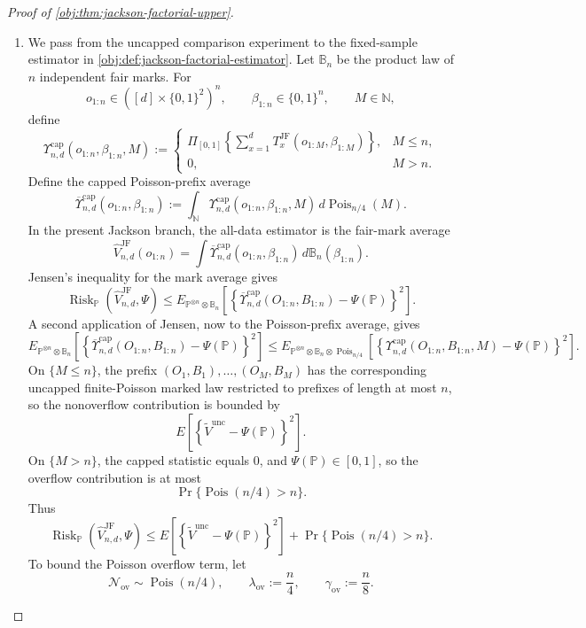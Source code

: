 \documentclass[11pt]{article}
\begin{document}
\begin{proof}[Proof of \cref{obj:thm:jackson-factorial-upper}]
\begin{enumerate}
\item We pass from the uncapped comparison experiment to the fixed-sample
estimator in \cref{obj:def:jackson-factorial-estimator}.  Let
\(\mathbb B_n\) be the product law of \(n\) independent fair marks.  For
\[
o_{1:n}\in([d]\times\{0,1\}^2)^n,
\qquad
\beta_{1:n}\in\{0,1\}^n,
\qquad
M\in\mathbb N,
\]
define
\[
\Upsilon_{n,d}^{\mathrm{cap}}(o_{1:n},\beta_{1:n},M)
:=
\begin{cases}
\Pi_{[0,1]}\!\left\{
\sum_{x=1}^d
T_x^{\mathrm{JF}}(o_{1:M},\beta_{1:M})
\right\},
& M\le n,\\[0.4em]
0, & M>n .
\end{cases}
\]
Define the capped Poisson-prefix average
\[
\overline\Upsilon_{n,d}^{\mathrm{cap}}(o_{1:n},\beta_{1:n})
:=
\int_{\mathbb N}
\Upsilon_{n,d}^{\mathrm{cap}}(o_{1:n},\beta_{1:n},M)\,
d\operatorname{Pois}_{n/4}(M).
\]
In the present Jackson branch, the all-data estimator is the fair-mark average
\[
\widehat V_{n,d}^{\mathrm{JF}}(o_{1:n})
=
\int
\overline\Upsilon_{n,d}^{\mathrm{cap}}(o_{1:n},\beta_{1:n})\,
d\mathbb B_n(\beta_{1:n}).
\]
Jensen's inequality for the mark average gives
\[
\operatorname{Risk}_{\mathbb P}
(\widehat V_{n,d}^{\mathrm{JF}},\Psi)
\le
E_{\mathbb P^{\otimes n}\otimes\mathbb B_n}
\left[
\left\{
\overline\Upsilon_{n,d}^{\mathrm{cap}}(O_{1:n},B_{1:n})
-\Psi(\mathbb P)
\right\}^2
\right].
\]
A second application of Jensen, now to the Poisson-prefix average, gives
\[
E_{\mathbb P^{\otimes n}\otimes\mathbb B_n}
\left[
\left\{
\overline\Upsilon_{n,d}^{\mathrm{cap}}(O_{1:n},B_{1:n})
-\Psi(\mathbb P)
\right\}^2
\right]
\le
E_{\mathbb P^{\otimes n}\otimes\mathbb B_n\otimes\operatorname{Pois}_{n/4}}
\left[
\left\{
\Upsilon_{n,d}^{\mathrm{cap}}(O_{1:n},B_{1:n},M)-\Psi(\mathbb P)
\right\}^2
\right].
\]
On \(\{M\le n\}\), the prefix
\((O_1,B_1),\ldots,(O_M,B_M)\) has the corresponding uncapped
finite-Poisson marked law restricted to prefixes of length at most \(n\), so
the nonoverflow contribution is bounded by
\[
E\left[
\left\{\widetilde V^{\mathrm{unc}}-\Psi(\mathbb P)\right\}^2
\right].
\]
On \(\{M>n\}\), the capped statistic equals \(0\), and
\(\Psi(\mathbb P)\in[0,1]\), so the overflow contribution is at most
\[
\Pr\{\operatorname{Pois}(n/4)>n\}.
\]
Thus
\[
\operatorname{Risk}_{\mathbb P}
(\widehat V_{n,d}^{\mathrm{JF}},\Psi)
\le
E\left[
\left\{\widetilde V^{\mathrm{unc}}-\Psi(\mathbb P)\right\}^2
\right]
+
\Pr\{\operatorname{Pois}(n/4)>n\}.
\]
To bound the Poisson overflow term, let
\[
\mathcal N_{\mathrm{ov}}\sim\operatorname{Pois}(n/4),
\qquad
\lambda_{\mathrm{ov}}:=\frac n4,
\qquad
\gamma_{\mathrm{ov}}:=\frac n8 .
\]
\end{enumerate}
\end{proof}
\end{document}

